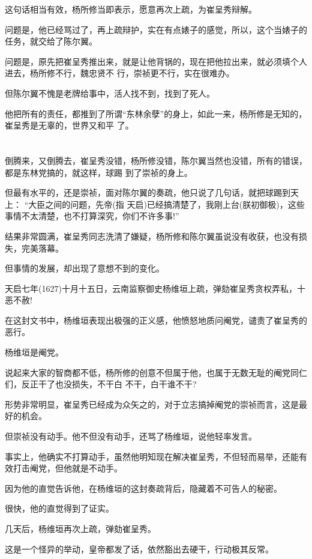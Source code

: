 \documentclass[11pt,a4paper,onecolumn]{article}
\begin{document}
这句话相当有效，杨所修当即表示，愿意再次上疏，为崔呈秀辩解。

问题是，他已经骂过了，再上疏辩护，实在有点婊子的感觉，所以，这个当婊子的任务，就交给了陈尔翼。

问题是，原先把崔呈秀推出来，就是让他背锅的，现在把他拉出来，就必须填个人进去，杨所修不行，魏忠贤不
行，崇祯更不行，实在很难办。

但陈尔翼不愧是老牌给事中，活人找不到，找到了死人。

他把所有的责任，都推到了所谓``东林余孽''的身上，如此一来，杨所修是无知的，崔呈秀是无辜的，世界又和平
了。

\section[\thesection]{}

倒腾来，又倒腾去，崔呈秀没错，杨所修没错，陈尔翼当然也没错，所有的错误，都是东林党搞的，就这样，球踢
到了崇祯的身上。

但最有水平的，还是崇祯，面对陈尔翼的奏疏，他只说了几句话，就把球踢到天上： ``大臣之间的问题，先帝(指
天启)已经搞清楚了，我刚上台(朕初御极)，这些事情不太清楚，也不打算深究，你们不许多事!''

结果非常圆满，崔呈秀同志洗清了嫌疑，杨所修和陈尔翼虽说没有收获，也没有损失，完美落幕。

但事情的发展，却出现了意想不到的变化。

天启七年(1627)十月十五日，云南监察御史杨维垣上疏，弹劾崔呈秀贪权弄私，十恶不赦!

在这封文书中，杨维垣表现出极强的正义感，他愤怒地质问阉党，谴责了崔呈秀的恶行。

杨维垣是阉党。

说起来大家的智商都不低，杨所修的创意不但属于他，也属于无数无耻的阉党同仁们，反正干了也没损失，不干白
不干，白干谁不干?

形势非常明显，崔呈秀已经成为众矢之的，对于立志搞掉阉党的崇祯而言，这是最好的机会。

但崇祯没有动手。他不但没有动手，还骂了杨维垣，说他轻率发言。

事实上，他确实不打算动手，虽然他明知现在解决崔呈秀，不但轻而易举，还能有效打击阉党，但他就是不动手。

因为他的直觉告诉他，在杨维垣的这封奏疏背后，隐藏着不可告人的秘密。

很快，他的直觉得到了证实。

几天后，杨维垣再次上疏，弹劾崔呈秀。

这是一个怪异的举动，皇帝都发了话，依然豁出去硬干，行动极其反常。
\end{document}
